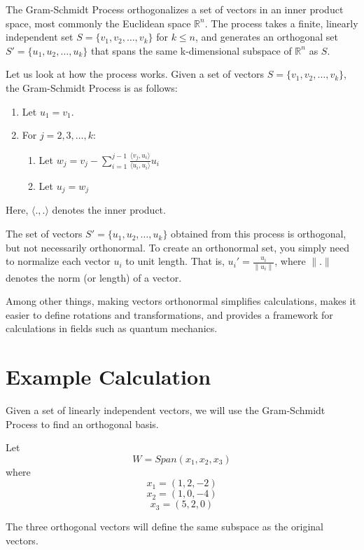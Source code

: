 The Gram-Schmidt Process orthogonalizes a set of vectors in an inner product space, most commonly the Euclidean space
$\mathbb{R}^n$. The process takes a finite, linearly independent set
$S = \{v_1, v_2, \ldots, v_k\}$ for $k \leq n$, and generates an
orthogonal set $S' = \{u_1, u_2, \ldots, u_k\}$ that spans the same
k-dimensional subspace of $\mathbb{R}^n$ as $S$.

Let us look at how the process works. Given a set of vectors $S = \{v_1, v_2, \ldots, v_k\}$, the Gram-Schmidt Process is as follows:

\begin{enumerate}
    \item Let $u_1 = v_1$.
    \item For $j = 2, 3, \ldots, k$:
    \begin{enumerate}
        \item Let $w_j = v_j - \sum_{i=1}^{j-1} \frac{\langle v_j, u_i \rangle}{\langle u_i, u_i \rangle} u_i$
        \item Let $u_j = w_j$
    \end{enumerate}
\end{enumerate}

Here, $\langle . , . \rangle$ denotes the inner product. 

The set of vectors $S' = \{u_1, u_2, \ldots, u_k\}$ obtained from this
process is orthogonal, but not necessarily orthonormal. To create
an orthonormal set, you simply need to normalize each vector $u_i$ to
unit length. That is, $u_i' = \frac{u_i}{\|u_i\|}$, where $\|.\|$
denotes the norm (or length) of a vector.

Among other things, making vectors orthonormal simplifies calculations, makes it easier to define rotations and transformations, and provides a framework for calculations in fields such as quantum mechanics.

\section{Example Calculation}

Given a set of linearly independent vectors, we will use the Gram-Schmidt Process to find an orthogonal basis.

Let $$W = Span (x_1, x_2, x_3)$$ where
$$x_1 = (1, 2, -2) $$
$$x_2 = (1,0,-4) $$
$$x_3 = (5,2,0)$$

The three orthogonal vectors will define the same subspace as the original vectors. 

